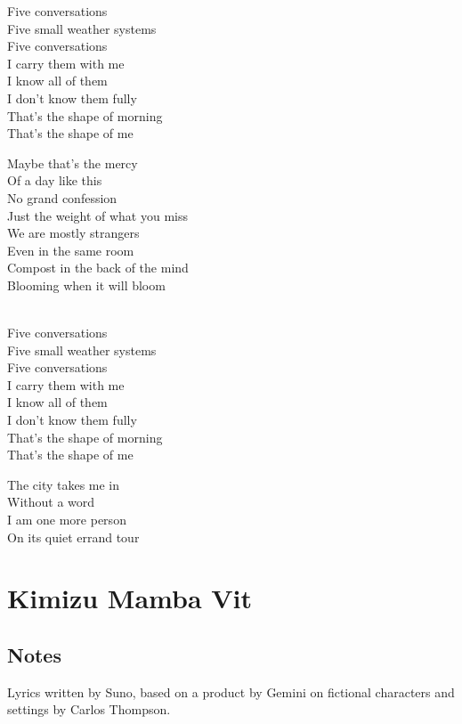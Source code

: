 \begin{lyrics}
Five conversations\\
Five small weather systems\\
Five conversations\\
I carry them with me\\
I know all of them\\
I don’t know them fully\\
That’s the shape of morning\\
That’s the shape of me

Maybe that’s the mercy\\
Of a day like this\\
No grand confession\\
Just the weight of what you miss\\
We are mostly strangers\\
Even in the same room\\
Compost in the back of the mind\\
Blooming when it will bloom

\\
Five conversations\\
Five small weather systems\\
Five conversations\\
I carry them with me\\
I know all of them\\
I don’t know them fully\\
That’s the shape of morning\\
That’s the shape of me

The city takes me in\\
Without a word\\
I am one more person\\
On its quiet errand tour

\end{lyrics}

\section{Kimizu Mamba Vit}

\subsection{Notes}
Lyrics written by Suno, based on a product by Gemini on fictional characters and settings by Carlos Thompson.

